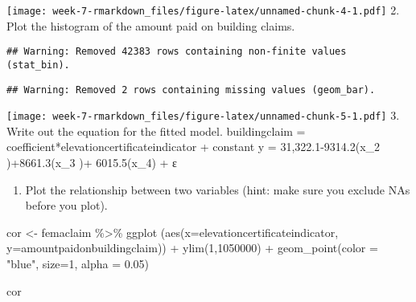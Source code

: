 \documentclass[
]{article}
\newenvironment{Shaded}{\begin{snugshade}}{\end{snugshade}}
\newcommand{\AttributeTok}[1]{\textcolor[rgb]{0.77,0.63,0.00}{#1}}
\newcommand{\ConstantTok}[1]{\textcolor[rgb]{0.00,0.00,0.00}{#1}}
\newcommand{\DecValTok}[1]{\textcolor[rgb]{0.00,0.00,0.81}{#1}}
\newcommand{\FloatTok}[1]{\textcolor[rgb]{0.00,0.00,0.81}{#1}}
\newcommand{\FunctionTok}[1]{\textcolor[rgb]{0.00,0.00,0.00}{#1}}
\newcommand{\NormalTok}[1]{#1}
\newcommand{\OtherTok}[1]{\textcolor[rgb]{0.56,0.35,0.01}{#1}}
\newcommand{\SpecialCharTok}[1]{\textcolor[rgb]{0.00,0.00,0.00}{#1}}
\newcommand{\StringTok}[1]{\textcolor[rgb]{0.31,0.60,0.02}{#1}}
\providecommand{\tightlist}{%
  \setlength{\itemsep}{0pt}\setlength{\parskip}{0pt}}
\begin{document}
\texttt{[image: week-7-rmarkdown\_files/figure-latex/unnamed-chunk-4-1.pdf]}
2. Plot the histogram of the amount paid on building claims.

\begin{Shaded}
\end{Shaded}

\begin{verbatim}
## Warning: Removed 42383 rows containing non-finite values (stat_bin).
\end{verbatim}

\begin{verbatim}
## Warning: Removed 2 rows containing missing values (geom_bar).
\end{verbatim}

\texttt{[image: week-7-rmarkdown\_files/figure-latex/unnamed-chunk-5-1.pdf]}
3. Write out the equation for the fitted model. buildingclaim =
coefficient*elevationcertificateindicator + constant y =
31,322.1-9314.2(x\_2 )+8661.3(x\_3 )+ 6015.5(x\_4) + ε

\begin{enumerate}
\def\labelenumi{\arabic{enumi}.}
\setcounter{enumi}{3}
\tightlist
\item
  Plot the relationship between two variables (hint: make sure you
  exclude NAs before you plot).
\end{enumerate}

\begin{Shaded}
\begin{Highlighting}[]
\NormalTok{cor }\OtherTok{\textless{}{-}}\NormalTok{ femaclaim }\SpecialCharTok{\%\textgreater{}\%}
  \FunctionTok{ggplot}\NormalTok{ (}\FunctionTok{aes}\NormalTok{(}\AttributeTok{x=}\NormalTok{elevationcertificateindicator, }\AttributeTok{y=}\NormalTok{amountpaidonbuildingclaim)) }\SpecialCharTok{+} \FunctionTok{ylim}\NormalTok{(}\DecValTok{1}\NormalTok{,}\DecValTok{1050000}\NormalTok{) }\SpecialCharTok{+} \FunctionTok{geom\_point}\NormalTok{(}\AttributeTok{color =} \StringTok{"blue"}\NormalTok{, }\AttributeTok{size=}\DecValTok{1}\NormalTok{, }\AttributeTok{alpha =} \FloatTok{0.05}\NormalTok{) }

\NormalTok{cor}
\end{Highlighting}
\end{Shaded}
\end{document}
